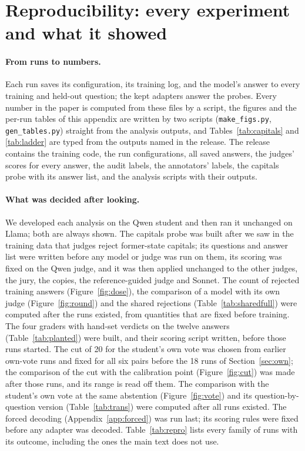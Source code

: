 \section{Reproducibility: every experiment and what it showed}
\label{app:repro}

\paragraph{From runs to numbers.} Each run saves its configuration, its training log, and the model's answer to every training and held-out question; the kept adapters answer the probes. Every number in the paper is computed from these files by a script, the figures and the per-run tables of this appendix are written by two scripts (\texttt{make\_figs.py}, \texttt{gen\_tables.py}) straight from the analysis outputs, and Tables~\ref{tab:capitals} and \ref{tab:ladder} are typed from the outputs named in the release. The release contains the training code, the run configurations, all saved answers, the judges' scores for every answer, the audit labels, the annotators' labels, the capitals probe with its answer list, and the analysis scripts with their outputs.

\paragraph{What was decided after looking.} We developed each analysis on the Qwen student and then ran it unchanged on Llama; both are always shown. The capitals probe was built after we saw in the training data that judges reject former-state capitals; its questions and answer list were written before any model or judge was run on them, its scoring was fixed on the Qwen judge, and it was then applied unchanged to the other judges, the jury, the copies, the reference-guided judge and Sonnet. The count of rejected training answers (Figure~\ref{fig:dose}), the comparison of a model with its own judge (Figure~\ref{fig:round}) and the shared rejections (Table~\ref{tab:sharedfull}) were computed after the runs existed, from quantities that are fixed before training. The four graders with hand-set verdicts on the twelve answers (Table~\ref{tab:planted}) were built, and their scoring script written, before those runs started. The cut of 20 for the student's own vote was chosen from earlier own-vote runs and fixed for all six pairs before the 18 runs of Section~\ref{sec:own}; the comparison of the cut with the calibration point (Figure~\ref{fig:cut}) was made after those runs, and its range is read off them. The comparison with the student's own vote at the same abstention (Figure~\ref{fig:vote}) and its question-by-question version (Table~\ref{tab:trans}) were computed after all runs existed. The forced decoding (Appendix~\ref{app:forced}) was run last; its scoring rules were fixed before any adapter was decoded. Table~\ref{tab:repro} lists every family of runs with its outcome, including the ones the main text does not use.

